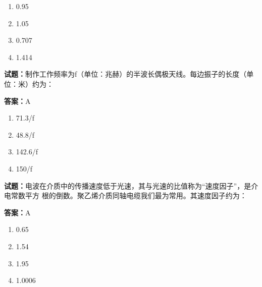\documentclass{ctexbook}
\begin{document}
\begin{enumerate}[leftmargin=3em]
  \item 0.95 

  \item 1.05 

  \item 0.707 


  \item 1.414 

\end{enumerate}





\vspace{1em}

\textbf{试题：}制作工作频率为f（单位：兆赫）的半波长偶极天线。每边振子的长度（单位：米）约为： 

\textbf{答案：}A 

\begin{enumerate}[leftmargin=3em]
  \item 71.3/f 

  \item 48.8/f 

  \item 142.6/f 

  \item 150/f 

\end{enumerate}





\vspace{1em}

\textbf{试题：}电波在介质中的传播速度低于光速，其与光速的比值称为“速度因子”，是介电常数平方
根的倒数。聚乙烯介质同轴电缆我们最为常用。其速度因子约为： 

\textbf{答案：}A 

\begin{enumerate}[leftmargin=3em]
  \item 0.65 

  \item 1.54 

  \item 1.95 

  \item 1.0006 

\end{enumerate}
\end{document}

